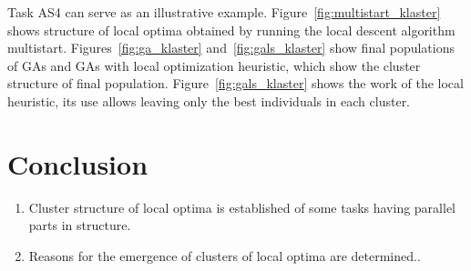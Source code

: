 \documentclass{ifacconf}
\begin{document}
Task AS4 can serve as an illustrative example. Figure~\ref{fig:multistart_klaster} shows structure of local optima obtained by running the local descent algorithm multistart. Figures~\ref{fig:ga_klaster} and~\ref{fig:gals_klaster} show final populations of GAs and GAs with local optimization heuristic, which show the cluster structure of final population. Figure~\ref{fig:gals_klaster} shows the work of the local heuristic, its use allows leaving only the best individuals in each cluster.

\section{Conclusion}

\begin{enumerate}

\item Cluster structure of local optima is established of some tasks having parallel parts in structure.

\item Reasons for the emergence of clusters of local optima are determined..

\end{enumerate}

   
                                                  
\end{document}
